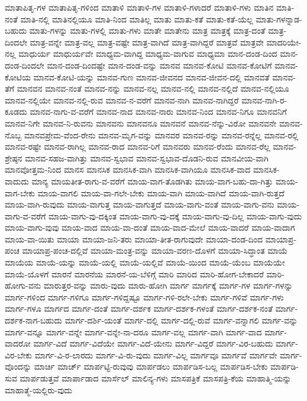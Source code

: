 {ಮಾತಾಪಿತೃ-ಗಳ
ಮಾತಾಪಿತೃ-ಗಳಿಂದ
ಮಾತಾಳಿ
ಮಾತಾಳಿ-ಗಳ
ಮಾತಾಳಿ-ಗಳಾದರೆ
ಮಾತಾಳಿ-ಗಳು
ಮಾತಿನ
ಮಾತಿ-ನಂತೆ
ಮಾತಿ-ನಲ್ಲಿ
ಮಾತಿನಲ್ಲಿಯೂ
ಮಾತಿ-ನಿಂದ
ಮಾತಿಲ್ಲ
ಮಾತು
ಮಾತು-ಕತೆ
ಮಾತು-ಕತೆ-ಯೆಲ್ಲ
ಮಾತು-ಗಳನ್ನಾಡ-ಬಹುದು
ಮಾತು-ಗಳನ್ನು
ಮಾತು-ಗಳಲ್ಲಿ
ಮಾತು-ಗಳು
ಮಾತೇ
ಮಾತೇನು
ಮಾತ್ರ
ಮಾತ್ರಕ್ಕೆ
ಮಾತ್ರ-ದಂತೆ
ಮಾತ್ರ-ದಿಂದಲೇ
ಮಾತ್ರ-ವನ್ನೇ
ಮಾತ್ರ-ವಲ್ಲ
ಮಾತ್ರ-ವಷ್ಟೇ
ಮಾತ್ರ-ವಾಗಿದೆ
ಮಾತ್ರ-ವಾಗಿದ್ದರೆ
ಮಾತ್ರವೆ
ಮಾತ್ರವೇ
ಮಾದರಿಯೇ-ನಲ್ಲ
ಮಾಧುರ್ಯ
ಮಾಧುರ್ಯವೇ
ಮಾಧ್ಯಮ-ವಾಗಿದ್ದ
ಮಾಧ್ಯಮ-ವಾಗುವ
ಮಾಧ್ಯಮಾ
ಮಾನ-ದಂಡ-ದಿಂದ
ಮಾನ-ದಂಡ-ದಿಂದಲೇ
ಮಾನ-ದಂಡ-ದಿಂದಷ್ಟೇ
ಮಾನ-ದಂಡ-ವನ್ನು
ಮಾನವ
ಮಾನವ-ಕೋಟಿ
ಮಾನವ-ಕೋಟಿಗೆ
ಮಾನವ-ಕೋಟಿಯ
ಮಾನವ-ಕೋಟಿ-ಯನ್ನು
ಮಾನವ-ಗುಣ
ಮಾನವ-ಜೀವನದ
ಮಾನವ-ಜೀವನ-ದಲ್ಲಿ
ಮಾನವತೆ
ಮಾನವ-ತೆಗೆ
ಮಾನವನ
ಮಾನವ-ನಂತೆ
ಮಾನವ-ನನ್ನು
ಮಾನವ-ನಲ್ಲ
ಮಾನವ-ನಲ್ಲಿ
ಮಾನವ-ನಲ್ಲಿದೆ
ಮಾನವ-ನಲ್ಲಿಯೂ
ಮಾನವ-ನಲ್ಲಿಯೇ
ಮಾನವ-ನಲ್ಲಿ-ರುವ
ಮಾನವ-ನ-ವರೆಗೆ
ಮಾನವ-ನಾಗಿ
ಮಾನವ-ನಾಗಿದ್ದರೆ
ಮಾನವ-ನಾಗಿ-ರ-ಕೂಡದು
ಮಾನವ-ನಾಗು-ವ-ವರೆಗೆ
ಮಾನವ-ನಾದ
ಮಾನವ-ನಾರು
ಮಾನವ-ನಿಂದ
ಮಾನವ-ನಿಗೂ
ಮಾನವನಿಗೆ
ಮಾನವ-ನಿಗೇ
ಮಾನವ-ನಿ-ರುವನು
ಮಾನವನು
ಮಾನವನೂ
ಮಾನವನೆ
ಮಾನವ-ನೆನ್ನು-ವಿರೋ
ಮಾನವನೇ
ಮಾನವ-ನೊಬ್ಬ
ಮಾನವಪ್ರೇಮ-ವೆಂದ-ರೇನು
ಮಾನವ-ಮೃಗ-ವನ್ನು
ಮಾನವರ
ಮಾನವ-ರನ್ನು
ಮಾನವ-ರನ್ನೆಲ್ಲ
ಮಾನವ-ರಲ್ಲಿ
ಮಾನವ-ರಷ್ಟೇ
ಮಾನವ-ರಾಗಿಲ್ಲ
ಮಾನವ-ರಾದ
ಮಾನವ-ರಿಗೆ
ಮಾನವರು
ಮಾನವ-ರೆಂದು
ಮಾನವ-ರೆಲ್ಲ
ಮಾನವ-ಶ್ರೇಷ್ಠನ
ಮಾನವ-ಸಹಜ-ವಾಗಿತ್ತು
ಮಾನವ-ಸ್ವಭಾವ
ಮಾನವ-ಸ್ವಭಾವ-ದೊಡನಿ-ರುವ
ಮಾನವೀಯ-ವಾಗಿ
ಮಾನವೋತ್ತಮ-ನಿಂದ
ಮಾನಸ
ಮಾನಸಿಕ
ಮಾನಸಿಕ-ವಾಗಿ
ಮಾನಸಿಕ-ವಾಗಿಯೂ
ಮಾನಸಿಕ-ವಾದ
ಮಾನಸಿಕ-ವಾದುದು
ಮಾನ್ಯ
ಮಾಯತೀತ-ರಾಗು-ವ-ವರೆಗೆ
ಮಾಯ-ವಾಗ-ತೊಡಗಿತು
ಮಾಯ-ವಾಗ-ಬಹು-ದಾ-ಗಿತ್ತು
ಮಾಯ-ವಾಗ-ಬೇಕು
ಮಾಯ-ವಾಗಲಿ
ಮಾಯ-ವಾ-ಗಲೇ-ಬೇಕು
ಮಾಯ-ವಾಗಿ
ಮಾಯ-ವಾಗಿದೆ
ಮಾಯ-ವಾಗಿ-ರುತ್ತದೆ
ಮಾಯ-ವಾಗಿ-ರುವುದು
ಮಾಯ-ವಾಗುತ್ತ
ಮಾಯ-ವಾಗುತ್ತದೆ
ಮಾಯ-ವಾಗು-ವಂತೆ
ಮಾಯ-ವಾಗು-ವನು
ಮಾಯ-ವಾಗು-ವ-ವರೆಗೆ
ಮಾಯ-ವಾಗು-ವು-ದಕ್ಕಿಂತ
ಮಾಯ-ವಾಗು-ವು-ದಕ್ಕೆ
ಮಾಯ-ವಾಗು-ವು-ದಿಲ್ಲ
ಮಾಯ-ವಾಗು-ವುದು
ಮಾಯ-ವಾಗು-ವುವು
ಮಾಯ-ವಾದ
ಮಾಯ-ವಾ-ದಂತೆ
ಮಾಯ-ವಾದ-ಮೇಲೆ
ಮಾಯ-ವಾದರೆ
ಮಾಯ-ವಾದಾಗ
ಮಾಯ-ವಾ-ಯಿತು
ಮಾಯಾ
ಮಾಯಾ-ಜನಿ-ತರು
ಮಾಯಾ-ತೀತ-ರಾಗುವುದೇ
ಮಾಯಾ-ದಂಡ-ದಿಂದ
ಮಾಯಾಪ್ರ-ಪಂಚ
ಮಾಯಾಪ್ರ-ಪಂಚ-ದಲ್ಲಿವೆ
ಮಾಯಾ-ಮಂತ್ರ-ವನ್ನು
ಮಾಯಾ-ವರಣ-ದೊಳಗೆ
ಮಾಯಾ-ಸಿದ್ಧಾಂತ
ಮಾಯೆ
ಮಾಯೆಯ
ಮಾಯೆ-ಯನ್ನು
ಮಾಯೆ-ಯಲ್ಲಿ
ಮಾಯೆ-ಯಲ್ಲಿವೆ
ಮಾಯೆ-ಯಿಂದ
ಮಾಯೆ-ಯೆಂಬ
ಮಾಯೆಯೇ
ಮಾಯೆ-ಯೊಳಗೆ
ಮಾರನೆ
ಮಾರನೆಯ
ಮಾರನೆ-ಯ-ಬೆಳಿಗ್ಗೆ
ಮಾರಿ
ಮಾರಿದ
ಮಾರಿ-ಹೋಗ-ಬೇಕಾದರೆ
ಮಾರಿ-ಹೋಗು-ವನು
ಮಾರುತ್ತರ-ವನ್ನು
ಮಾರು-ವುದು
ಮಾರು-ಹೋಗಿ
ಮಾರ್ಗ
ಮಾರ್ಗಕ್ಕೆ
ಮಾರ್ಗ-ಗಳ
ಮಾರ್ಗ-ಗಳನ್ನು
ಮಾರ್ಗ-ಗಳಿಂದ
ಮಾರ್ಗ-ಗಳಿಗೂ
ಮಾರ್ಗ-ಗಳಿದ್ದಷ್ಟೂ
ಮಾರ್ಗ-ಗಳಿ-ರಲೇ-ಬೇಕು
ಮಾರ್ಗ-ಗಳಿವೆ
ಮಾರ್ಗ-ಗಳು
ಮಾರ್ಗ-ಗಳೂ
ಮಾರ್ಗದ
ಮಾರ್ಗ-ದಂತೆ
ಮಾರ್ಗ-ದರ್ಶಕ
ಮಾರ್ಗ-ದರ್ಶಕ-ಗಳಂತೆ
ಮಾರ್ಗ-ದರ್ಶಕ-ನಂತೆ
ಮಾರ್ಗ-ದರ್ಶಕ-ನಾಗ-ಬಹುದು
ಮಾರ್ಗ-ದರ್ಶಿ-ಯಂತೆ
ಮಾರ್ಗ-ದಲ್ಲಿ
ಮಾರ್ಗ-ದಲ್ಲಿ-ರುವೆ
ಮಾರ್ಗ-ವನ್ನಾಗಲಿ
ಮಾರ್ಗ-ವನ್ನು
ಮಾರ್ಗ-ವನ್ನೂ
ಮಾರ್ಗ-ವನ್ನೇ
ಮಾರ್ಗ-ವನ್ನೇ-ನಾ-ದರೂ
ಮಾರ್ಗ-ವಲ್ಲ
ಮಾರ್ಗ-ವಾಗಿ
ಮಾರ್ಗ-ವಾದ
ಮಾರ್ಗ-ವಾದರೋ
ಮಾರ್ಗ-ವಿದೆ
ಮಾರ್ಗ-ವಿದೆಯೇ
ಮಾರ್ಗ-ವಿದೆ-ಯೇನು
ಮಾರ್ಗ-ವಿದ್ದರೆ
ಮಾರ್ಗ-ವಿರ-ಬಹುದು
ಮಾರ್ಗ-ವಿರ-ಬೇಕು
ಮಾರ್ಗ-ವಿ-ರ-ಲಾರದು
ಮಾರ್ಗ-ವಿ-ರು-ವುದು
ಮಾರ್ಗ-ವಿಲ್ಲ
ಮಾರ್ಗವೂ
ಮಾರ್ಗವೆ
ಮಾರ್ಗವೇ
ಮಾರ್ಗ-ವೊಂದನ್ನು
ಮಾರ್ಚಿ
ಮಾರ್ಚ್
ಮಾರ್ಪಟ್ಟಿ-ರುವುವು
ಮಾರ್ಪಡಲು
ಮಾರ್ಪಡಿಸ-ಬಲ್ಲ
ಮಾರ್ಪಡಿಸ-ಬೇಕು
ಮಾರ್ಪಡಿ-ಸುವ
ಮಾರ್ಪಡುತ್ತವೆ
ಮಾರ್ಪಾಡಾದ
ಮಾರ್ಸೆಲ್
ಮಾಲಿನ್ಯ-ಗಳು
ಮಾಸಪತ್ರಿಕೆ
ಮಾಸಪತ್ರಿ-ಕೆಯ
ಮಾಹಾತ್ಮಿ-ಯನ್ನು
ಮಾಹಾತ್ಮೆ-ಯಲ್ಲಿರು-ವುದು
}
